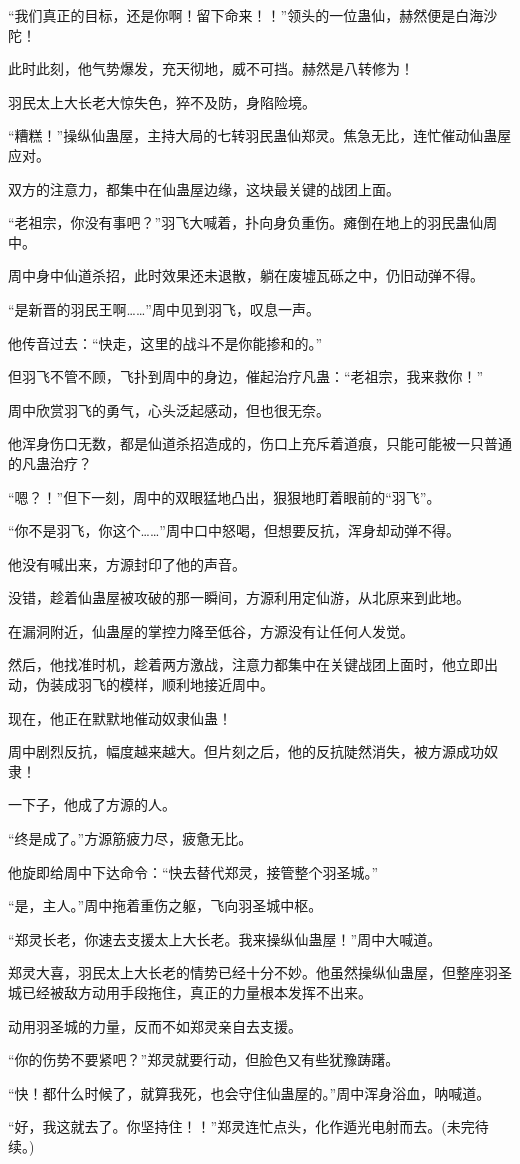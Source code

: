 \begin{this_body}
“我们真正的目标，还是你啊！留下命来！！”领头的一位蛊仙，赫然便是白海沙陀！

此时此刻，他气势爆发，充天彻地，威不可挡。赫然是八转修为！

羽民太上大长老大惊失色，猝不及防，身陷险境。

“糟糕！”操纵仙蛊屋，主持大局的七转羽民蛊仙郑灵。焦急无比，连忙催动仙蛊屋应对。

双方的注意力，都集中在仙蛊屋边缘，这块最关键的战团上面。

“老祖宗，你没有事吧？”羽飞大喊着，扑向身负重伤。瘫倒在地上的羽民蛊仙周中。

周中身中仙道杀招，此时效果还未退散，躺在废墟瓦砾之中，仍旧动弹不得。

“是新晋的羽民王啊……”周中见到羽飞，叹息一声。

他传音过去：“快走，这里的战斗不是你能掺和的。”

但羽飞不管不顾，飞扑到周中的身边，催起治疗凡蛊：“老祖宗，我来救你！”

周中欣赏羽飞的勇气，心头泛起感动，但也很无奈。

他浑身伤口无数，都是仙道杀招造成的，伤口上充斥着道痕，只能可能被一只普通的凡蛊治疗？

“嗯？！”但下一刻，周中的双眼猛地凸出，狠狠地盯着眼前的“羽飞”。

“你不是羽飞，你这个……”周中口中怒喝，但想要反抗，浑身却动弹不得。

他没有喊出来，方源封印了他的声音。

没错，趁着仙蛊屋被攻破的那一瞬间，方源利用定仙游，从北原来到此地。

在漏洞附近，仙蛊屋的掌控力降至低谷，方源没有让任何人发觉。

然后，他找准时机，趁着两方激战，注意力都集中在关键战团上面时，他立即出动，伪装成羽飞的模样，顺利地接近周中。

现在，他正在默默地催动奴隶仙蛊！

周中剧烈反抗，幅度越来越大。但片刻之后，他的反抗陡然消失，被方源成功奴隶！

一下子，他成了方源的人。

“终是成了。”方源筋疲力尽，疲惫无比。

他旋即给周中下达命令：“快去替代郑灵，接管整个羽圣城。”

“是，主人。”周中拖着重伤之躯，飞向羽圣城中枢。

“郑灵长老，你速去支援太上大长老。我来操纵仙蛊屋！”周中大喊道。

郑灵大喜，羽民太上大长老的情势已经十分不妙。他虽然操纵仙蛊屋，但整座羽圣城已经被敌方动用手段拖住，真正的力量根本发挥不出来。

动用羽圣城的力量，反而不如郑灵亲自去支援。

“你的伤势不要紧吧？”郑灵就要行动，但脸色又有些犹豫踌躇。

“快！都什么时候了，就算我死，也会守住仙蛊屋的。”周中浑身浴血，呐喊道。

“好，我这就去了。你坚持住！！”郑灵连忙点头，化作遁光电射而去。(未完待续。)

\end{this_body}

